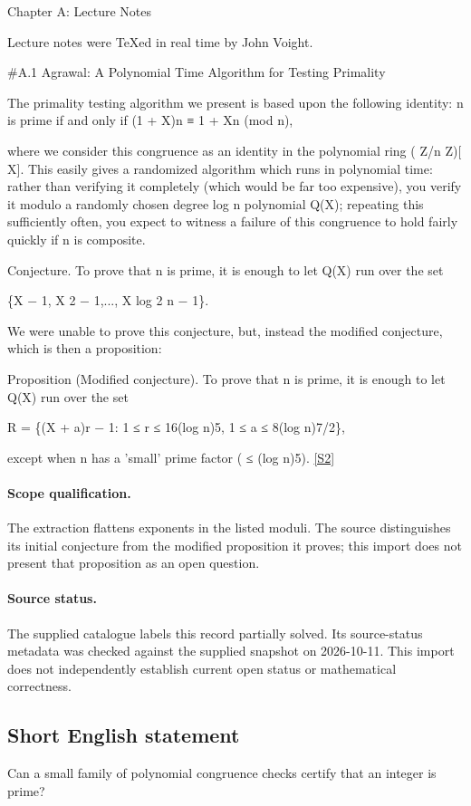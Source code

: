 \documentclass[11pt]{article}
\begin{document}
Chapter A: Lecture Notes

Lecture notes were TeXed in real time by John Voight.

\#A.1 Agrawal: A Polynomial Time Algorithm for Testing Primality

The primality testing algorithm we present is based upon the following identity: n is prime if and only if (1 + X)n ≡ 1 + Xn (mod n),

where we consider this congruence as an identity in the polynomial ring ( Z/n Z)[ X]. This easily gives a randomized algorithm which runs in polynomial time: rather than verifying it completely (which would be far too expensive), you verify it modulo a randomly chosen degree log n polynomial Q(X); repeating this sufficiently often, you expect to witness a failure of this congruence to hold fairly quickly if n is composite.

Conjecture. To prove that n is prime, it is enough to let Q(X) run over the set

\{X − 1, X 2 − 1,..., X log 2 n − 1\}.

We were unable to prove this conjecture, but, instead the modified conjecture, which is then a proposition:

Proposition (Modified conjecture). To prove that n is prime, it is enough to let Q(X) run over the set

R = \{(X + a)r − 1: 1 ≤ r ≤ 16(log n)5, 1 ≤ a ≤ 8(log n)7/2\},

except when n has a 'small' prime factor ( ≤ (log n)5). \href{https://aimath.org/WWN/primesinp/primesinp.pdf}{[S2]}
\paragraph{Scope qualification.}
The extraction flattens exponents in the listed moduli. The source distinguishes its initial conjecture from the modified proposition it proves; this import does not present that proposition as an open question.
\paragraph{Source status.}
The supplied catalogue labels this record partially solved. Its source-status metadata was checked against the supplied snapshot on 2026-10-11. This import does not independently establish current open status or mathematical correctness.
\subsection{Short English statement}
Can a small family of polynomial congruence checks certify that an integer is prime?
\end{document}
